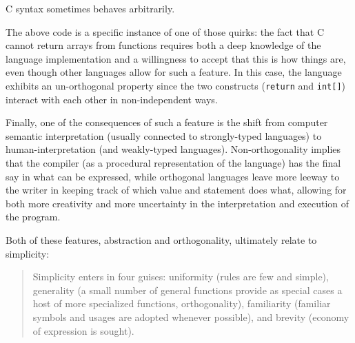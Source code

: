 \begin{listing}
  \inputminted{go}{./corpus/illegal_return.c}
  \caption{C syntax sometimes behaves arbitrarily.}
  \label{code:illegal-return}
\end{listing}

The above code is a specific instance of one of those quirks: the fact that C cannot return arrays from functions requires both a deep knowledge of the language implementation and a willingness to accept that this is how things are, even though other languages allow for such a feature. In this case, the language exhibits an un-orthogonal property since the two constructs (\lstinline{return} and \lstinline{int[]}) interact with each other in non-independent ways.

Finally, one of the consequences of such a feature is the shift from computer semantic interpretation (usually connected to strongly-typed languages) to human-interpretation (and weakly-typed languages). Non-orthogonality implies that the compiler (as a procedural representation of the language) has the final say in what can be expressed, while orthogonal languages leave more leeway to the writer in keeping track of which value and statement does what, allowing for both more creativity and more uncertainty in the interpretation and execution of the program.

Both of these features, abstraction and orthogonality, ultimately relate to simplicity:

\begin{quote}
  Simplicity enters in four guises: uniformity (rules are few and simple), generality (a small number of general functions provide as special cases a host of more specialized functions, orthogonality), familiarity (familiar symbols and usages are adopted whenever possible), and brevity (economy of expression is sought).\citep{stansifer_study_1994}
\end{quote}

